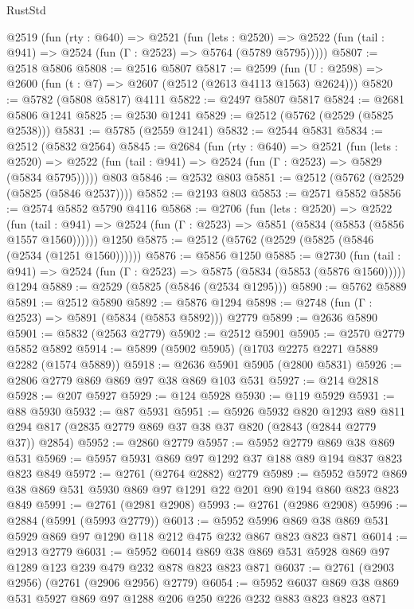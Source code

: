 \begin{lexlean}{RustStd}
\begin{coremodule}
  @2519
    (fun (rty : @640) =>
    @2521
      (fun (lets : @2520) =>
      @2522 (fun (tail : @941) => @2524 (fun (Γ : @2523) => @5764 (@5789 @5795)))))
@5807 := @2518 @5806
@5808 := @2516 @5807
@5817 := @2599 (fun (U : @2598) => @2600 (fun (t : @7) => @2607 (@2512 (@2613 @4113 @1563) @2624)))
@5820 := @5782 (@5808 @5817) @4111
@5822 := @2497 @5807 @5817
@5824 := @2681 @5806 @1241
@5825 := @2530 @1241
@5829 := @2512 (@5762 (@2529 (@5825 @2538)))
@5831 := @5785 (@2559 @1241)
@5832 := @2544 @5831
@5834 := @2512 (@5832 @2564)
@5845 := @2684
    (fun (rty : @640) =>
    @2521
      (fun (lets : @2520) =>
      @2522 (fun (tail : @941) => @2524 (fun (Γ : @2523) => @5829 (@5834 @5795)))))
    @803
@5846 := @2532 @803
@5851 := @2512 (@5762 (@2529 (@5825 (@5846 @2537))))
@5852 := @2193 @803
@5853 := @2571 @5852
@5856 := @2574 @5852 @5790 @4116
@5868 := @2706
    (fun (lets : @2520) =>
    @2522
      (fun (tail : @941) => @2524 (fun (Γ : @2523) => @5851 (@5834 (@5853 (@5856 @1557 @1560))))))
    @1250
@5875 := @2512 (@5762 (@2529 (@5825 (@5846 (@2534 (@1251 @1560))))))
@5876 := @5856 @1250
@5885 := @2730
    (fun (tail : @941) => @2524 (fun (Γ : @2523) => @5875 (@5834 (@5853 (@5876 @1560)))))
    @1294
@5889 := @2529 (@5825 (@5846 (@2534 @1295)))
@5890 := @5762 @5889
@5891 := @2512 @5890
@5892 := @5876 @1294
@5898 := @2748 (fun (Γ : @2523) => @5891 (@5834 (@5853 @5892))) @2779
@5899 := @2636 @5890
@5901 := @5832 (@2563 @2779)
@5902 := @2512 @5901
@5905 := @2570 @2779 @5852 @5892
@5914 := @5899 (@5902 @5905) (@1703 @2275 @2271 @5889 @2282 (@1574 @5889))
@5918 := @2636 @5901 @5905 (@2800 @5831)
@5926 := @2806 @2779 @869 @869 @97 @38 @869 @103 @531
@5927 := @214 @2818
@5928 := @207 @5927
@5929 := @124 @5928
@5930 := @119 @5929
@5931 := @88 @5930
@5932 := @87 @5931
@5951 := @5926
    @5932
    @820
    @1293
    @89
    @811
    @294
    @817
    (@2835 @2779 @869 @37 @38 @37 @820 (@2843 (@2844 @2779 @37)) @2854)
@5952 := @2860 @2779
@5957 := @5952 @2779 @869 @38 @869 @531
@5969 := @5957 @5931 @869 @97 @1292 @37 @188 @89 @194 @837 @823 @823 @849
@5972 := @2761 (@2764 @2882) @2779
@5989 := @5952 @5972 @869 @38 @869 @531 @5930 @869 @97 @1291 @22 @201 @90 @194 @860 @823 @823 @849
@5991 := @2761 (@2981 @2908)
@5993 := @2761 (@2986 @2908)
@5996 := @2884 (@5991 (@5993 @2779))
@6013 := @5952 @5996 @869 @38 @869 @531 @5929 @869 @97 @1290 @118 @212 @475 @232 @867 @823 @823 @871
@6014 := @2913 @2779
@6031 := @5952 @6014 @869 @38 @869 @531 @5928 @869 @97 @1289 @123 @239 @479 @232 @878 @823 @823 @871
@6037 := @2761 (@2903 @2956) (@2761 (@2906 @2956) @2779)
@6054 := @5952 @6037 @869 @38 @869 @531 @5927 @869 @97 @1288 @206 @250 @226 @232 @883 @823 @823 @871

\end{coremodule}
\end{lexlean}
